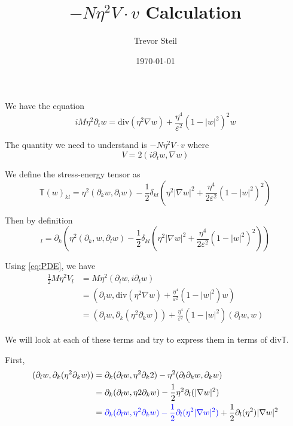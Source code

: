 \documentclass[a4paper]{article}
\title{$-N \eta^2 V \cdot v$ Calculation }
\date{\today}
\author{Trevor Steil}
\renewcommand{\div}{\mathrm{div}}
\begin{document}
\maketitle

We have the equation
\begin{equation}
  i M \eta^2 \partial_t w = \div (\eta^2 \nabla w) + \frac{\eta^4}{\varepsilon^2} (1-|w|^2)^2 w
  \label{eq:PDE}
\end{equation}

The quantity we need to understand is $-N \eta^2 V \cdot v$ where
\begin{equation}
  V = 2 ( i \partial_t w, \nabla w )
  \label{def:V}
\end{equation}

We define the stress-energy tensor as
\begin{equation}
  \mathbb{T}(w)_{kl} = \eta^2 (\partial_k w, \partial_l w) - \frac{1}{2} \delta_{kl} \left( \eta^2 | \nabla w |^2 + \frac{\eta^4}{2 \varepsilon^2}
  (1-|w|^2)^2 \right)
  \label{def:T}
\end{equation}

Then by definition
\begin{equation}
  [ \div \mathbb{T}(w) ]_l = \partial_k \left( \eta^2 (\partial_k, w, \partial_l w) - \frac{1}{2} \delta_{kl} \left( \eta^2 |\nabla w|^2 +
  \frac{\eta^4}{2 \varepsilon^2} ( 1- |w|^2 )^2 \right) \right)
  \label{eq:div_T}
\end{equation}

Using \eqref{eq:PDE}, we have
\begin{align}
  \frac{1}{2} M \eta^2 V_l &= M \eta^2 ( \partial_l w, i \partial_t w ) \nonumber \\
  &= \left( \partial_l w, \div ( \eta^2 \nabla w ) + \frac{\eta^4}{\varepsilon^2}( 1 - |w|^2 )w \right) \nonumber \\
  &= ( \partial_l w, \partial_k ( \eta^2 \partial_k w ) ) + \frac{\eta^4}{\varepsilon^2} ( 1 - |w|^2 ) ( \partial_l w, w )
  \label{eq:V_l}
\end{align}

We will look at each of these terms and try to express them in terms of $\div \mathbb{T}$.

First,
\begin{align}
  ( \partial_l w, \partial_k ( \eta^2 \partial_k w ) ) &= \partial_k ( \partial_l w, \eta^2 \partial_k 2) - \eta^2 ( \partial_l \partial_k w,
  \partial_k w ) \nonumber \\
  &= \partial_k ( \partial_l w, \eta2 \partial_k w) - \frac{1}{2} \eta^2 \partial_l ( | \nabla w |^2 ) \nonumber \\
  &= { \color{blue} \partial_k ( \partial_l w, \eta^2 \partial_k w) - \frac{1}{2} \partial_l ( \eta^2 |\nabla w|^2 ) } + \frac{1}{2} \partial_l
  (\eta^2) | \nabla w |^2
  \label{eq:V_l_term1}
\end{align}
\end{document}

